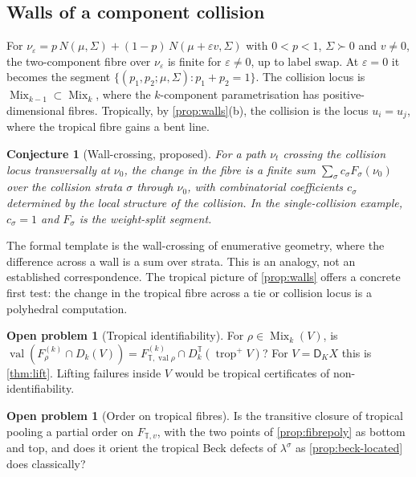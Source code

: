 \documentclass[11pt]{article}
\newtheorem{conjecture}[theorem]{Conjecture}
\theoremstyle{definition}
\newtheorem{problem}[theorem]{Open problem}
\newcommand{\DK}{\mathsf D_{K}}
\newcommand{\T}{\mathbb T}
\newcommand{\ls}{\lambda^{\sigma}}
\newcommand{\val}{\operatorname{val}}
\newcommand{\trop}{\operatorname{trop}}
\newcommand{\Mix}{\operatorname{Mix}}
\begin{document}
\subsection{Walls of a component collision}
For $\nu_\varepsilon=p\,N(\mu,\Sigma)+(1-p)\,N(\mu+\varepsilon v,\Sigma)$ with $0<p<1$, $\Sigma\succ0$ and $v\ne0$, the two-component
fibre over $\nu_\varepsilon$ is finite for $\varepsilon\ne0$, up to label swap. At $\varepsilon=0$ it becomes the segment
$\{(p_1,p_2;\mu,\Sigma):p_1+p_2=1\}$. The collision locus is $\Mix_{k-1}\subset\Mix_k$, where the $k$-component parametrisation has
positive-dimensional fibres. Tropically, by \cref{prop:walls}(b), the collision is the locus $u_i=u_j$, where the tropical fibre gains
a bent line.

\begin{conjecture}[Wall-crossing, proposed]\label{conj:wall}
For a path $\nu_t$ crossing the collision locus transversally at $\nu_0$, the change in the fibre is a finite sum
$\sum_\sigma c_\sigma F_\sigma(\nu_0)$ over the collision strata $\sigma$ through $\nu_0$, with combinatorial coefficients $c_\sigma$
determined by the local structure of the collision. In the single-collision example, $c_\sigma=1$ and $F_\sigma$ is the weight-split
segment.
\end{conjecture}

The formal template is the wall-crossing of enumerative geometry, where the difference across a wall is a sum over strata. This is an
analogy, not an established correspondence. The tropical picture of \cref{prop:walls} offers a concrete first test: the change in the
tropical fibre across a tie or collision locus is a polyhedral computation.

\begin{problem}[Tropical identifiability]\label{op:ident}
For $\rho\in\Mix_k(V)$, is $\val(F^{(k)}_\rho\cap D_k(V))=F^{(k)}_{\T,\val\rho}\cap D^\T_k(\trop^+V)$? For $V=\DK X$ this is
\cref{thm:lift}. Lifting failures inside $V$ would be tropical certificates of non-identifiability.
\end{problem}

\begin{problem}[Order on tropical fibres]\label{op:order}
Is the transitive closure of tropical pooling a partial order on $F_{\T,v}$, with the two points of \cref{prop:fibrepoly} as bottom
and top, and does it orient the tropical Beck defects of $\ls$ as \cref{prop:beck-located} does classically?
\end{problem}
\end{document}
